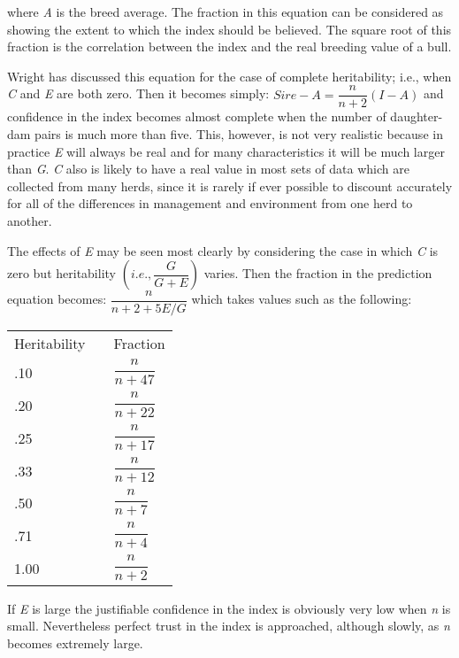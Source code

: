 \noindent
where \textit{A} is the breed average. The fraction in this equation can be
considered as showing the extent to which the index should be believed.
The square root of this fraction is the correlation between the index
and the real breeding value of a bull.

Wright has discussed this equation for the case of complete heritability;
i.e., when \textit{C} and \textit{E} are both zero. Then it becomes simply:
\(Sire - A = \dfrac{n}{n + 2}(I - A)\) and confidence in the index becomes almost
complete when the number of daughter-dam pairs is much more than
five. This, however, is not very realistic because in practice \textit{E} will
always be real and for many characteristics it will be much larger than
\textit{G}. \textit{C} also is likely to have a real value in most sets of data
which are collected from many herds, since it is rarely if ever possible to
discount accurately for all of the differences in management and environment
from one herd to another.

The effects of \textit{E} may be seen most clearly by considering the case in
which \textit{C} is zero but heritability \(\left(i.e., \dfrac{G}{G + E}\right)\) varies.
Then the fraction in the prediction equation becomes: \(\dfrac{n}{n + 2 + 5E/G}\)
which takes values such as the following:

{\renewcommand{\arraystretch}{2}%
\begin{table}[h]
	\centering
	\begin{tabular}{C{2cm}C{1cm}C{2cm}}
	Heritability	& & Fraction			\\
	.10				& & $\dfrac{n}{n + 47}$	\\
	.20				& & $\dfrac{n}{n + 22}$	\\
	.25				& & $\dfrac{n}{n + 17}$	\\
	.33				& & $\dfrac{n}{n + 12}$	\\
	.50				& & $\dfrac{n}{n + 7}$	\\
	.71				& & $\dfrac{n}{n + 4}$	\\
	1.00			& & $\dfrac{n}{n + 2}$
	\end{tabular}
\end{table}}

\noindent
If \textit{E} is large the justifiable confidence in the index is obviously
very low when \textit{n} is small. Nevertheless perfect trust in the index
is approached, although slowly, as \textit{n} becomes extremely large.

